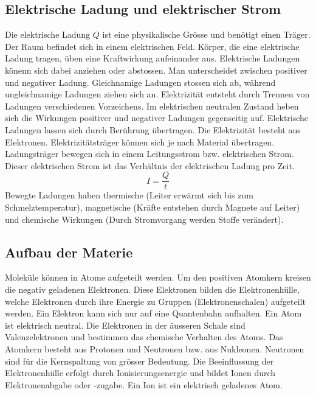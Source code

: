 \subsection{Elektrische Ladung und elektrischer Strom}
Die elektrische Ladung $Q$ ist eine physikalische Grösse und benötigt einen Träger. Der Raum befindet sich in einem elektrischen Feld. Körper, die eine elektrische Ladung tragen, üben eine Kraftwirkung aufeinander aus.
\newline\newline
Elektrische Ladungen könenn sich dabei anziehen oder abstossen. Man unterscheidet zwischen positiver und negativer Ladung. Gleichnamige Ladungen stossen sich ab, während ungleichnamige Ladungen ziehen sich an. Elektrizität entsteht durch Trennen von Ladungen verschiedenen Vorzeichens.
\newline\newline
Im elektrischen neutralen Zustand heben sich die Wirkungen positiver und negativer Ladungen gegenseitig auf. Elektrische Ladungen lassen sich durch Berührung übertragen. Die Elektrizität besteht aus Elektronen.
\newline\newline
Elektrizitätsträger können sich je nach Material übertragen. Ladungsträger bewegen sich in einem Leitungsstrom bzw. elektrischen Strom. Dieser elektrischen Strom ist das Verhältnis der elektrischen Ladung pro Zeit.
\begin{equation}
\boxed{I=\dfrac{Q}{t}}
\end{equation}
Bewegte Ladungen haben thermische (Leiter erwärmt sich bis zum Schmelztemperatur), magnetische (Kräfte entstehen durch Magnete auf Leiter) und chemische Wirkungen (Durch Stromvorgang werden Stoffe verändert).
\subsection{Aufbau der Materie}
Moleküle können in Atome aufgeteilt werden. Um den positiven Atomkern kreisen die negativ geladenen Elektronen. Diese Elektronen bilden die Elektronenhülle, welche Elektronen durch ihre Energie zu Gruppen (Elektronenschalen) aufgeteilt werden. Ein Elektron kann sich nur auf eine Quantenbahn aufhalten. Ein Atom ist elektrisch neutral. Die Elektronen in der äusseren Schale sind Valenzelektronen und bestimmen das chemische Verhalten des Atoms.
\newline\newline
Das Atomkern besteht aus Protonen und Neutronen bzw. aus Nukleonen. Neutronen sind für die Kernspaltung von grösser Bedeutung. Die Beeinflussung der Elektronenhülle erfolgt durch Ionisierungsenergie und bildet Ionen durch Elektronenabgabe oder -zugabe. Ein Ion ist ein elektrisch geladenes Atom.
